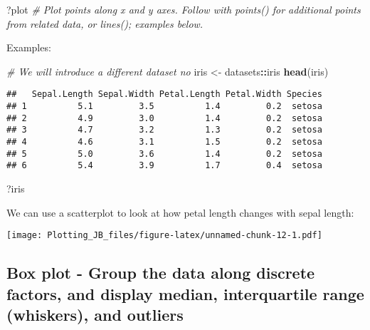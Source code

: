 \documentclass[]{article}
\newenvironment{Shaded}{\begin{snugshade}}{\end{snugshade}}
\newcommand{\CommentTok}[1]{\textcolor[rgb]{0.56,0.35,0.01}{\textit{#1}}}
\newcommand{\KeywordTok}[1]{\textcolor[rgb]{0.13,0.29,0.53}{\textbf{#1}}}
\newcommand{\NormalTok}[1]{#1}
\newcommand{\OperatorTok}[1]{\textcolor[rgb]{0.81,0.36,0.00}{\textbf{#1}}}
\newcommand{\StringTok}[1]{\textcolor[rgb]{0.31,0.60,0.02}{#1}}
\begin{document}
\begin{Shaded}
\begin{Highlighting}[]
\NormalTok{?plot }\CommentTok{# Plot points along x and y axes. Follow with points() for additional points from related data, or lines(); examples below.}
\end{Highlighting}
\end{Shaded}

Examples:

\begin{Shaded}
\begin{Highlighting}[]
\CommentTok{# We will introduce a different dataset no}
\NormalTok{iris <-}\StringTok{ }\NormalTok{datasets}\OperatorTok{::}\NormalTok{iris}
\KeywordTok{head}\NormalTok{(iris)}
\end{Highlighting}
\end{Shaded}

\begin{verbatim}
##   Sepal.Length Sepal.Width Petal.Length Petal.Width Species
## 1          5.1         3.5          1.4         0.2  setosa
## 2          4.9         3.0          1.4         0.2  setosa
## 3          4.7         3.2          1.3         0.2  setosa
## 4          4.6         3.1          1.5         0.2  setosa
## 5          5.0         3.6          1.4         0.2  setosa
## 6          5.4         3.9          1.7         0.4  setosa
\end{verbatim}

\begin{Shaded}
\begin{Highlighting}[]
\NormalTok{?iris}
\end{Highlighting}
\end{Shaded}

We can use a scatterplot to look at how petal length changes with sepal
length:

\begin{Shaded}
\end{Shaded}

\texttt{[image: Plotting\_JB\_files/figure-latex/unnamed-chunk-12-1.pdf]}

\hypertarget{box-plot---group-the-data-along-discrete-factors-and-display-median-interquartile-range-whiskers-and-outliers}{%
\subsection{Box plot - Group the data along discrete factors, and
display median, interquartile range (whiskers), and
outliers}\label{box-plot---group-the-data-along-discrete-factors-and-display-median-interquartile-range-whiskers-and-outliers}}
\end{document}
